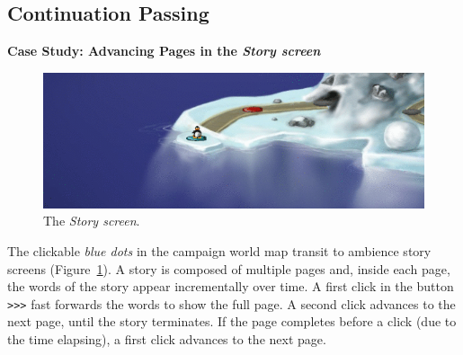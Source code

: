 \documentclass{vgtc}                          %
\newcommand{\code}[1] {{\small{\texttt{#1}}}}
\begin{document}
\subsection{Continuation Passing}

\textbf{Case Study: Advancing Pages in the \emph{Story screen}}

\begin{figure}[t]
\centering
\includegraphics[width=\columnwidth]{story-anim}
\caption{The \emph{Story screen}.
\label{fig.story}
}
\end{figure}

The clickable \emph{blue dots} in the campaign world map transit to ambience
story screens (Figure~\ref{fig.story}).
A story is composed of multiple pages and, inside each page, the words of the
story appear incrementally over time.
A first click in the button \code{>>>} fast forwards the words to show the full 
page.
A second click advances to the next page, until the story terminates.
If the page completes before a click (due to the time elapsing), a first click 
advances to the next page.
\end{document}
